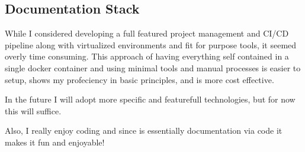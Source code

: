 \subsection{Documentation Stack}

While I considered developing a full featured project management and CI/CD pipeline 
along with virtualized environments and fit for purpose tools, it seemed overly time
consuming.  This approach of having everything self contained in a single docker 
container and using minimal tools and manual processes is easier to setup, shows my
profeciency in basic principles, and is more cost effective.

In the future I will adopt more specific and featurefull technologies, but for now
this will suffice.

Also, I really enjoy coding and since \LaTeXe{} is essentially documentation via code
it makes it fun and enjoyable!